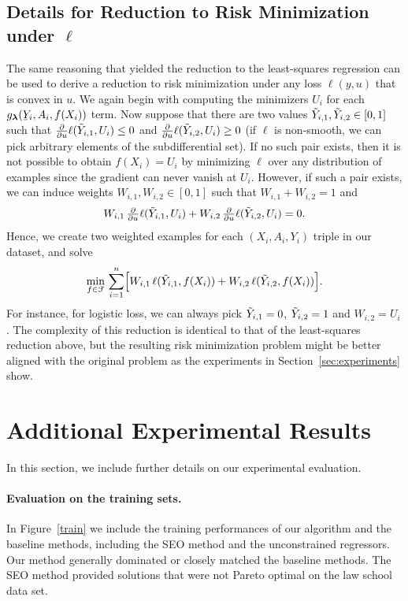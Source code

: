 \subsection{Details for Reduction to Risk Minimization under $\ell$}
\label{app:reduction:ell}

The same reasoning that yielded the reduction to the least-squares regression can be used to derive
a reduction to risk minimization under any loss $\ell(y,u)$ that is convex in $u$. We again begin with computing the minimizers $U_i$ for each $g_{\vlambda}(\underY_i, A_i, f(X_i))$ term. Now suppose that there are two values $\tilde{Y}_{i,1},\tilde{Y}_{i,2} \in [0,1]$ such that $\frac{\partial}{\partial u} \ell(\tilde{Y}_{i,1},U_i) \leq 0$ and $\frac{\partial}{\partial u} \ell(\tilde{Y}_{i,2},U_i) \geq 0$ (if $\ell$ is non-smooth, we can pick arbitrary elements of the subdifferential set). If no such pair exists, then it is not possible to obtain $f(X_i) = U_i$ by minimizing $\ell$ over any distribution of examples since the gradient can never vanish at $U_i$. However, if such a pair exists, we can induce weights $W_{i,1}, W_{i,2}\in[0,1]$ such that $W_{i,1} + W_{i,2} = 1$ and
\[\textstyle
  W_{i,1}\,\frac{\partial}{\partial u} \ell(\tilde{Y}_{i,1},U_i) + W_{i,2}\,\frac{\partial}{\partial u} \ell(\tilde{Y}_{i,2},U_i) = 0.
\]
Hence, we create two weighted examples for each $(X_i,A_i,Y_i)$ triple in our dataset, and solve
\[
\min_{f \in \mathcal{F}}\,\sum_{i=1}^n\Bigl[W_{i,1}\,\ell(\tilde{Y}_{i,1}, f(X_i)) + W_{i,2}\,\ell(\tilde{Y}_{i,2},f(X_i))\Bigr].
\]
%
For instance, for logistic loss, we can always pick $\tilde{Y}_{i,1} = 0$, $\tilde{Y}_{i,2} = 1$ and $W_{i,2} = U_i$. The complexity of this reduction is identical to that of the least-squares reduction above, but the resulting risk minimization problem might be better aligned with the original problem as the experiments
in Section~\ref{sec:experiments} show.


\section{Additional Experimental Results}
\label{app:exp}

In this section, we include further details on our experimental
evaluation.

\paragraph{Evaluation on the training sets.} In Figure~\ref{train} we
include the training performances of our algorithm and the baseline
methods, including the SEO method and the unconstrained
regressors. Our method generally dominated or closely matched the baseline
methods. The SEO method provided solutions that were not Pareto
optimal on the law school data set.

